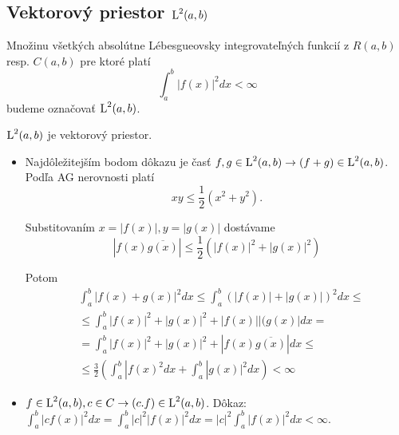 
\subsection{Vektorový priestor $\mbox{L}^2(a,b)$}

\begin{definicia}
    Množinu všetkých absolútne Lébesgueovsky integrovateľných 
    funkcií z $R(a,b)$ resp. $C(a,b)$ pre ktoré platí
    \begin{equation}
        \int_a^b |f(x)|^2 dx < \infty
    \end{equation}
    budeme označovať $\mbox{L}^2(a,b)$.
\end{definicia}

\begin{lema}
    $\mbox{L}^2(a,b)$ je vektorový priestor.
\end{lema}

\begin{dokaz}
\begin{itemize}
\item
    Najdôležitejším bodom dôkazu je časť 
    $f,g \in \mbox{L}^2(a,b) \rightarrow (f+g)\in \mbox{L}^2(a,b)$.
    Podľa AG nerovnosti platí 
    \begin{equation*}
        xy \le \frac{1}{2}(x^2 + y^2).
    \end{equation*}
    
    Substitovaním $x=|f(x)|,y=|g(x)|$ dostávame
    \begin{equation*}
        |f(x)\overline{g(x)}| \le \frac{1}{2} 
        ( |f(x)|^2 + |g(x)|^2)
    \end{equation*}
    
     Potom
    \begin{eqnarray*}
    & \int_a^b |f(x)+g(x)|^2 dx  \le
    \int_a^b (|f(x)|+|g(x)|)^2 dx \le \\    
    & \le  \int_a^b |f(x)|^2 + |g(x)|^2 + |f(x)||(g(x)| dx = \\
    & = \int_a^b |f(x)|^2 + |g(x)|^2 + |f(x) \overline{g(x)}| dx \le \\
    & \le \frac{3}{2}( \int_a^b |f(x)^2 dx + \int_a^b |g(x)|^2 dx)
    < \infty
    \end{eqnarray*}
\item
    $f \in \mbox{L}^2(a,b), c\in C \rightarrow (c.f) \in \mbox{L}^2(a,b)$.
    Dôkaz: $\int_a^b |cf(x)|^2 dx = \int_a^b |c|^2 |f(x)|^2 dx =
             |c|^2 \int_a^b |f(x)|^2 dx < \infty$.
\end{itemize}
\end{dokaz}

